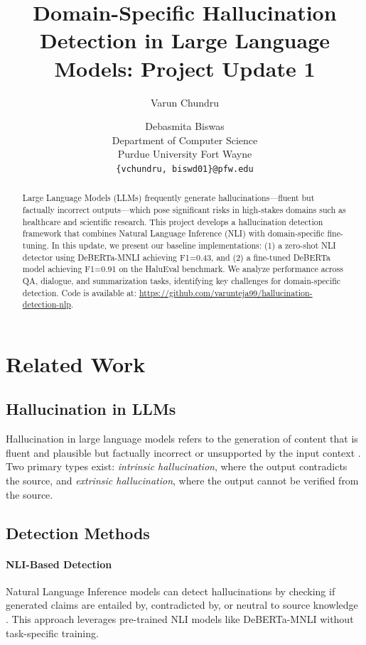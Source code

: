 \documentclass[11pt]{article}
\title{Domain-Specific Hallucination Detection in Large Language Models: Project Update 1}
\author{Varun Chundru \and Debasmita Biswas \\
  Department of Computer Science \\
  Purdue University Fort Wayne \\
  \texttt{\{vchundru, biswd01\}@pfw.edu}}
\begin{document}
\maketitle

\begin{abstract}
Large Language Models (LLMs) frequently generate hallucinations---fluent but factually incorrect outputs---which pose significant risks in high-stakes domains such as healthcare and scientific research. This project develops a hallucination detection framework that combines Natural Language Inference (NLI) with domain-specific fine-tuning. In this update, we present our baseline implementations: (1) a zero-shot NLI detector using DeBERTa-MNLI achieving F1=0.43, and (2) a fine-tuned DeBERTa model achieving F1=0.91 on the HaluEval benchmark. We analyze performance across QA, dialogue, and summarization tasks, identifying key challenges for domain-specific detection. Code is available at: \url{https://github.com/varunteja99/hallucination-detection-nlp}.
\end{abstract}

\section{Related Work}

\subsection{Hallucination in LLMs}

Hallucination in large language models refers to the generation of content that is fluent and plausible but factually incorrect or unsupported by the input context \cite{ji2023survey}. Two primary types exist: \textit{intrinsic hallucination}, where the output contradicts the source, and \textit{extrinsic hallucination}, where the output cannot be verified from the source.

\subsection{Detection Methods}

\paragraph{NLI-Based Detection} Natural Language Inference models can detect hallucinations by checking if generated claims are entailed by, contradicted by, or neutral to source knowledge \cite{honovich2022true}. This approach leverages pre-trained NLI models like DeBERTa-MNLI without task-specific training.
\end{document}
